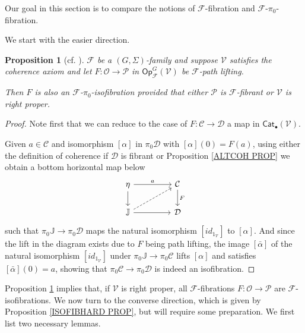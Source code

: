 \documentclass[a4paper,10pt
,draft
]{article}%
\numberwithin{equation}{section}
\numberwithin{figure}{section}
\newtheorem{proposition}[equation]{Proposition}%
\theoremstyle{definition} %
\newcommand{\Op}{\mathsf{Op}}%
\newcommand{\F}{\ensuremath{\mathcal F}}
\newcommand{\V}{\ensuremath{\mathcal V}}
\renewcommand{\O}{\ensuremath{\mathcal O}}
\renewcommand{\P}{\ensuremath{\mathcal P}}
\newcommand{\1}{\ensuremath{\mathbbm 1}}%
\begin{document}
Our goal in this section is to compare the 
notions of $\F$-fibration and $\F$-$\pi_0$-fibration.

We start with the easier direction.


\begin{proposition}[{cf. \cite[Props. 2.3]{Ber07b}}]
	\label{ISOFIBEASY PROP}
	$\F$ be a $(G,\Sigma)$-family and 
	suppose $\V$ satisfies the coherence axiom
	and let 
	$F: \O \to \P$ in $\Op^G_\F(\V)$
	be $\F$-path lifting.
	
	Then $F$ is also an $\F$-$\pi_0$-isofibration
	provided that either $\mathcal{P}$ is $\F$-fibrant
	or $\V$ is right proper.
\end{proposition}


\begin{proof}
	Note first that we can reduce to 
	the case of $F \colon \mathcal{C} \to \mathcal{D}$
	a map in $\mathsf{Cat}_{\bullet} (\V)$.

	Given $a \in \mathcal{C}$
	and isomorphism $[\alpha]$ in $\pi_0 \mathcal{D}$
	with $[\alpha](0)=F(a)$,
	using either the definition of coherence 
	if $\mathcal{D}$ is fibrant or 
	Proposition \ref{ALTCOH PROP}
	we obtain a bottom horizontal map below 
\begin{equation}
	\begin{tikzcd}[column sep = 45pt]
	\eta \ar{d} \ar{r}{a}
&
	\mathcal{C} \ar{d}{F}
	\\
	\mathbb{J} \ar{r} \ar[dashed]{ru}
&
	\mathcal{D}
	\end{tikzcd}
\end{equation}
	such that $\pi_0 \mathbb{J} \to \pi_0\mathcal{D}$
	maps the natural isomorphism $[id_{1_{\V}}]$ to $[\alpha]$.
	And since the lift in the diagram exists due to $F$ being path lifting,
	the image $[\bar{\alpha}]$
	of the natural isomorphism $[id_{1_{\V}}]$
	under $\pi_0 \mathbb{J} \to \pi_0\mathcal{C}$
	lifts $[\alpha]$
	and satisfies $[\bar{\alpha}](0) = a$,
	showing that
	$\pi_0 \mathcal{C} \to \pi_0 \mathcal{D}$
	is indeed an isofibration.
\end{proof}




Proposition \ref{ISOFIBEASY PROP}
implies that, if $\V$ is right proper,
all $\F$-fibrations $F \colon \mathcal{O} \to \mathcal{P}$ are $\F$-isofibrations.
%
We now turn to the converse direction, which
is given by Proposition \ref{ISOFIBHARD PROP}, 
but will require some preparation.
We first list two necessary lemmas.
\end{document}
